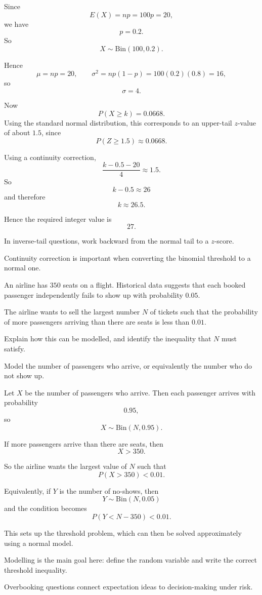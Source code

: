 \begin{solution}
Since
\[
E(X)=np=100p=20,
\]
we have
\[
p=0.2.
\]
So
\[
X\sim \mathrm{Bin}(100,0.2).
\]

Hence
\[
\mu=np=20,
\qquad
\sigma^2=np(1-p)=100(0.2)(0.8)=16,
\]
so
\[
\sigma=4.
\]

Now
\[
P(X\ge k)=0.0668.
\]
Using the standard normal distribution, this corresponds to an upper-tail $z$-value of about $1.5$, since
\[
P(Z\ge 1.5)\approx 0.0668.
\]

Using a continuity correction,
\[
\frac{k-0.5-20}{4}\approx 1.5.
\]
So
\[
k-0.5\approx 26
\]
and therefore
\[
k\approx 26.5.
\]

Hence the required integer value is
\[
\boxed{27}.
\]
\end{solution}

\begin{takeaways}
\item In inverse-tail questions, work backward from the normal tail to a $z$-score.
\item Continuity correction is important when converting the binomial threshold to a normal one.
\end{takeaways}

\begin{problem}
An airline has $350$ seats on a flight. Historical data suggests that each booked passenger independently fails to show up with probability $0.05$.

The airline wants to sell the largest number $N$ of tickets such that the probability of more passengers arriving than there are seats is less than $0.01$.

Explain how this can be modelled, and identify the inequality that $N$ must satisfy.
\end{problem}

\begin{hint}
Model the number of passengers who arrive, or equivalently the number who do not show up.
\end{hint}

\begin{solution}
Let $X$ be the number of passengers who arrive. Then each passenger arrives with probability
\[
0.95,
\]
so
\[
X\sim \mathrm{Bin}(N,0.95).
\]

If more passengers arrive than there are seats, then
\[
X>350.
\]

So the airline wants the largest value of $N$ such that
\[
P(X>350)<0.01.
\]

Equivalently, if $Y$ is the number of no-shows, then
\[
Y\sim \mathrm{Bin}(N,0.05)
\]
and the condition becomes
\[
P(Y<N-350)<0.01.
\]

This sets up the threshold problem, which can then be solved approximately using a normal model.
\end{solution}

\begin{takeaways}
\item Modelling is the main goal here: define the random variable and write the correct threshold inequality.
\item Overbooking questions connect expectation ideas to decision-making under risk.
\end{takeaways}
